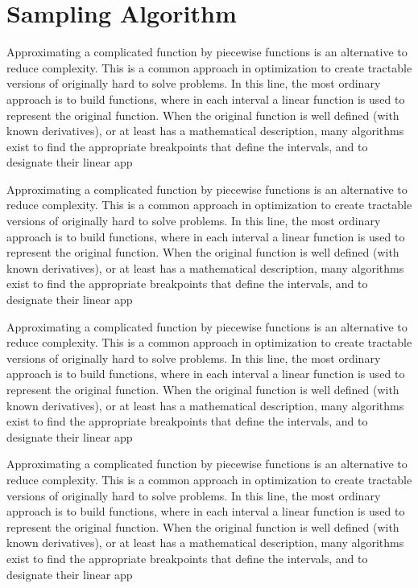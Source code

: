 %

\chapter{Sampling Algorithm} \label{chap:sampling-alg}


Approximating a complicated function by piecewise functions is an alternative to reduce complexity. 
This is a common approach in optimization to create tractable versions of originally hard to solve problems.
%
In this line, the most ordinary approach is to build  functions, where in each interval a linear function is used to represent the original function. 
%
When the original function is well defined (with known derivatives), or at least has a mathematical description, many algorithms exist to find the appropriate breakpoints that define the intervals, and to designate their linear app

Approximating a complicated function by piecewise functions is an alternative to reduce complexity. 
This is a common approach in optimization to create tractable versions of originally hard to solve problems.
%
In this line, the most ordinary approach is to build  functions, where in each interval a linear function is used to represent the original function. 
%
When the original function is well defined (with known derivatives), or at least has a mathematical description, many algorithms exist to find the appropriate breakpoints that define the intervals, and to designate their linear app

Approximating a complicated function by piecewise functions is an alternative to reduce complexity. 
This is a common approach in optimization to create tractable versions of originally hard to solve problems.
%
In this line, the most ordinary approach is to build  functions, where in each interval a linear function is used to represent the original function. 
%
When the original function is well defined (with known derivatives), or at least has a mathematical description, many algorithms exist to find the appropriate breakpoints that define the intervals, and to designate their linear app

Approximating a complicated function by piecewise functions is an alternative to reduce complexity. 
This is a common approach in optimization to create tractable versions of originally hard to solve problems.
%
In this line, the most ordinary approach is to build  functions, where in each interval a linear function is used to represent the original function. 
%
When the original function is well defined (with known derivatives), or at least has a mathematical description, many algorithms exist to find the appropriate breakpoints that define the intervals, and to designate their linear app

